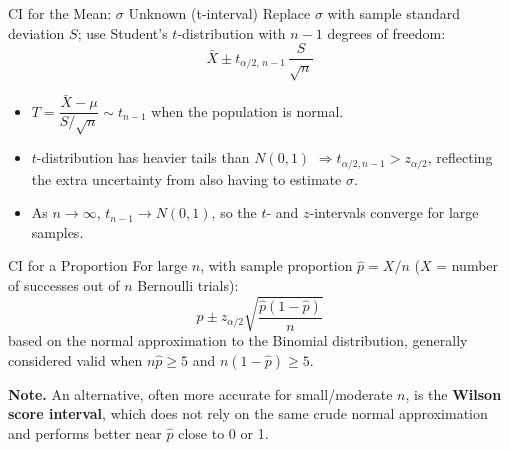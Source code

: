 \documentclass[11pt,aspectratio=169]{beamer}
\newcommand{\Xbar}{\bar{X}}
\newcommand{\Note}[1]{\textbf{Note.} #1}
\begin{document}
\begin{frame}{CI for the Mean: $\sigma$ Unknown (t-interval)}
Replace $\sigma$ with sample standard deviation $S$; use Student's
$t$-distribution with $n-1$ degrees of freedom:
\[
    \Xbar \pm t_{\alpha/2,\,n-1}\,\frac{S}{\sqrt n}
\]
\begin{itemize}
    \item $T=\dfrac{\Xbar-\mu}{S/\sqrt n}\sim t_{n-1}$ when the population
          is normal.
    \item $t$-distribution has heavier tails than $N(0,1)$
          $\Rightarrow t_{\alpha/2,n-1} > z_{\alpha/2}$, reflecting the
          extra uncertainty from also having to estimate $\sigma$.
    \item As $n\to\infty$, $t_{n-1}\to N(0,1)$, so the $t$- and
          $z$-intervals converge for large samples.
\end{itemize}
\end{frame}

\begin{frame}{CI for a Proportion}
For large $n$, with sample proportion $\hat p = X/n$ ($X$ = number of
successes out of $n$ Bernoulli trials):
\[
    \hat p \pm z_{\alpha/2}\sqrt{\frac{\hat p(1-\hat p)}{n}}
\]
based on the normal approximation to the Binomial distribution, generally
considered valid when $n\hat p \ge 5$ and $n(1-\hat p)\ge 5$.

\Note{An alternative, often more accurate for small/moderate $n$, is the
\textbf{Wilson score interval}, which does not rely on the same crude
normal approximation and performs better near $\hat p$ close to 0 or 1.}
\end{frame}
\end{document}
